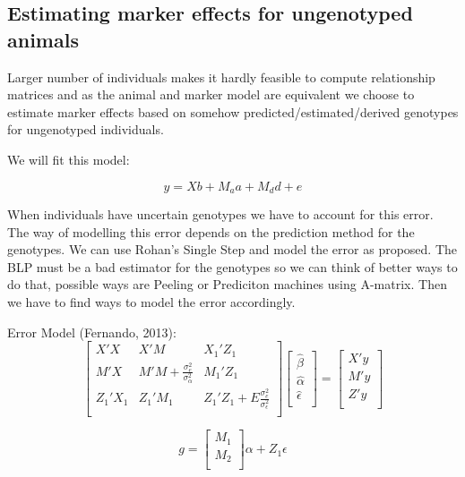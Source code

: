 \documentclass[a4paper,DIVcalc,12pt,liststotoc,bibtotoc,headsepline,plainheadsepline]{scrartcl}
\begin{document}
\subsection{Estimating marker effects for ungenotyped animals}

Larger number of individuals makes it hardly feasible to compute relationship matrices and as the animal and marker model are equivalent we choose to estimate marker effects based on somehow predicted/estimated/derived genotypes for ungenotyped individuals.

We will fit this model:

\begin{equation*}
y = Xb + M_a a + M_d d + e 
\end{equation*}

When individuals have uncertain genotypes we have to account for this error. The way of modelling this error depends on the prediction method for the genotypes. We can use Rohan's Single Step and model the error as proposed.
The BLP must be a bad estimator for the genotypes so we can think of better ways to do that, possible ways are Peeling or Prediciton machines using A-matrix. Then we have to find ways to model the error accordingly.

\clearpage
\thispagestyle{sectionstyle}
Error Model (Fernando, 2013):
\begin{equation*}
 \begin{bmatrix}
  X'X & X'M & X_1'Z_1 \\
  M'X & M'M + \frac{\sigma_{e}^2}{\sigma_{\alpha}^2}& M_1'Z_1  \\
  Z_1'X_1 & Z_1'M_1 & Z_1'Z_1 + E \frac{\sigma_{e}^2}{\sigma_{\epsilon}^2}  \\
 \end{bmatrix} 
  \begin{bmatrix}
  \hat{\beta} \\
  \hat{\alpha} \\
  \hat{\epsilon} \\
 \end{bmatrix} = 
  \begin{bmatrix}
  X'y\\
  M'y\\
  Z'y\\
 \end{bmatrix} 
\end{equation*}

\begin{equation*}
g = \begin{bmatrix} M_1 \\ M_2 \\ \end{bmatrix} \alpha + Z_1 \epsilon
\end{equation*}
\end{document}
